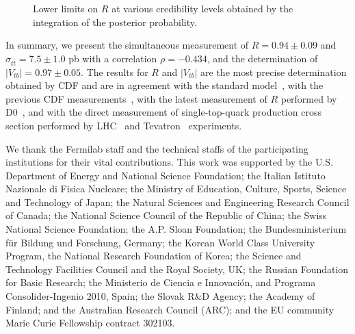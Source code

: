 \documentclass[aps,prd,twocolumn,superscriptaddress,showpacs]{revtex4}
\begin{document}
 
 \begin{figure}[h!]
\begin{center}
\caption{Lower limits on $R$ at various credibility levels obtained by the integration of the posterior probability.}
\label{fig:fitmargin}
\end{center}
\end{figure}

In summary, we present the simultaneous measurement of 
$R = 0.94 \pm 0.09$ and  $\sigma_{t\bar{t}} = 7.5 \pm 1.0$ pb with a 
correlation $\rho = -0.434$, 
and the determination of  $\left|V_{tb}\right| = 0.97 \pm 0.05$.  
The results for $R$ and $\left|V_{tb}\right|$ are the most precise determination obtained by CDF and 
are in agreement with the standard model~\cite{PDG}, 
with the previous CDF measurements~\cite{R2005}, with the latest
measurement of $R$ performed by D0~\cite{d0meas}, 
and with the direct  
measurement of single-top-quark production cross section 
 performed by LHC~\cite{singleLHC}  and Tevatron~\cite{singleTeV,singletop} experiments.


We thank the Fermilab staff and the technical staffs of the participating institutions for their vital 
contributions. This work was supported by the U.S. Department of Energy and National Science Foundation; 
the Italian Istituto Nazionale di Fisica Nucleare; the Ministry of Education, Culture, Sports, Science 
and Technology of Japan; the Natural Sciences and Engineering Research Council of Canada; the National 
Science Council of the Republic of China; the Swiss National Science Foundation; the A.P. Sloan Foundation; 
the Bundesministerium f\"ur Bildung und Forschung, Germany; the Korean World Class University Program, 
the National Research Foundation of Korea; the Science and Technology Facilities Council and the Royal Society, 
UK; the Russian Foundation for Basic Research; the Ministerio de Ciencia e Innovaci\'{o}n, and Programa 
Consolider-Ingenio 2010, Spain; the Slovak R\&D Agency; the Academy of Finland; and the Australian 
Research Council (ARC); and the EU community Marie Curie Fellowship contract 302103.
\end{document}
